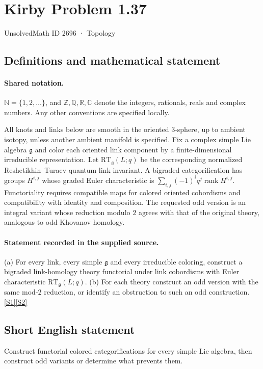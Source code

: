 \documentclass[11pt]{article}
\newcommand{\sref}[2]{\hyperlink{source:#1:#2}{[S#2]}}
\begin{document}
\setcounter{section}{2695}
\section{Kirby Problem 1.37}\label{2696}
{\small\sffamily UnsolvedMath ID 2696 · Topology}
\subsection{Definitions and mathematical statement}

\paragraph{Shared notation.}$\mathbb N=\{1,2,\ldots\}$, and $\mathbb Z,\mathbb Q,\mathbb R,\mathbb C$ denote the integers, rationals, reals and complex numbers. Any other conventions are specified locally.


All knots and links below are smooth in the oriented $3$-sphere, up to ambient isotopy, unless another ambient manifold is specified. Fix a complex simple Lie algebra $\mathfrak g$ and color each oriented link component by a finite-dimensional irreducible representation. Let $\mathrm{RT}_{\mathfrak g}(L;q)$ be the corresponding normalized Reshetikhin--Turaev quantum link invariant. A bigraded categorification has groups $H^{i,j}$ whose graded Euler characteristic is $\sum_{i,j}(-1)^i q^j\operatorname{rank}H^{i,j}$. Functoriality requires compatible maps for colored oriented cobordisms and compatibility with identity and composition. The requested odd version is an integral variant whose reduction modulo $2$ agrees with that of the original theory, analogous to odd Khovanov homology.
\paragraph{Statement recorded in the supplied source.}
(a) For every link, every simple $\mathfrak g$ and every irreducible coloring, construct a bigraded link-homology theory functorial under link cobordisms with Euler characteristic $\mathrm{RT}_{\mathfrak g}(L;q)$. (b) For each theory construct an odd version with the same mod-$2$ reduction, or identify an obstruction to such an odd construction. \sref{2696}{1}\sref{2696}{2}
\subsection{Short English statement}
Construct functorial colored categorifications for every simple Lie algebra, then construct odd variants or determine what prevents them.
\end{document}
